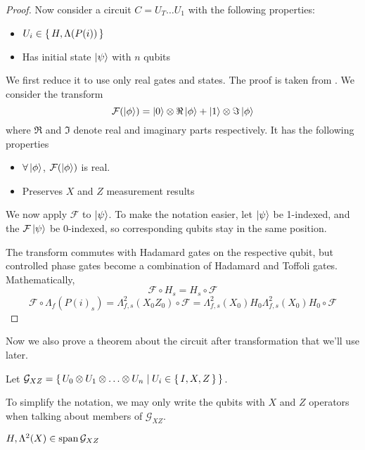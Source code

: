 \begin{proof}

Now consider a circuit $C=U_T\ldots U_1$ with the following properties:
\begin{itemize}
	\item $U_i\in\set{H, \Lambda(P(i))}$
	\item Has initial state $\ket\psi$ with $n$ qubits
\end{itemize}

We first reduce it to use only real gates and states. The proof is taken from \cite{quant-ph/0301040}. We consider the transform
$$\mathcal{F}(\ket{\phi})=\ket{0}\otimes\Re\ket{\phi}+\ket{1}\otimes\Im\ket{\phi}$$
where $\Re$ and $\Im$ denote real and imaginary parts respectively. It has the following properties

\begin{itemize}
	\item $\forall\ket\phi$, $\mathcal{F}(\ket\phi)$ is real.
	\item Preserves $X$ and $Z$ measurement results
\end{itemize}

We now apply $\mathcal{F}$ to $\ket\psi$. To make the notation easier, let $\ket{\psi}$ be 1-indexed, and the $\mathcal{F}\ket{\psi}$ be 0-indexed, so corresponding qubits stay in the same position.

The transform commutes with Hadamard gates on the respective qubit, but controlled phase gates become a combination of Hadamard and Toffoli gates. Mathematically,
$$\mathcal{F}\circ H_s=H_s\circ\mathcal{F}$$
$$\mathcal{F}\circ\Lambda_f(P(i)_s)=\Lambda^2_{f,s}(X_0Z_0)\circ\mathcal{F}=\Lambda^2_{f,s}(X_0)H_0\Lambda^2_{f,s}(X_0)H_0\circ\mathcal{F}$$
\end{proof}

Now we also prove a theorem about the circuit after transformation that we'll use later.

\begin{definition}
	Let $\mathcal{G}_{XZ}=\set{U_0\otimes U_1\otimes\ldots\otimes U_n|U_i\in\set{I,X,Z}}$.
\end{definition}

To simplify the notation, we may only write the qubits with $X$ and $Z$ operators when talking about members of $\mathcal{G}_{XZ}$.

\begin{theorem}
	$H,\Lambda^2(X)\in\operatorname*{\operatorname{span}}\mathcal{G}_{XZ}$
\end{theorem}

